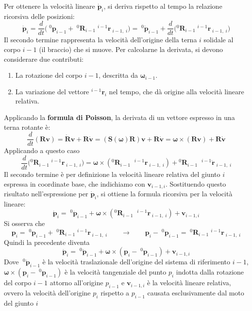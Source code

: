﻿\documentclass[11pt, a4paper]{article}
\begin{document}
Per ottenere la velocità lineare \(\dot{\bm{p}}_i\), si deriva rispetto al tempo la relazione ricorsiva delle posizioni:
\[
    \dot{\bm{p}}_i = \frac{d}{dt} \biggl( \;^{0}\bm{p}_{i-1} + \;^{0}\bm{R}_{i-1} \;^{i-1}{\bm{r}}_{\; i-1, \; i} \biggr) = \;^{0}\dot{\bm{p}}_{i-1} + \frac{d}{dt} \biggl( {}^{0}\bm{R}_{i-1} \;^{i-1}{\bm{r}}_{\; i-1, \; i} \biggr)
\]
Il secondo termine rappresenta la velocità dell'origine della terna \(i\) solidale al corpo \(i-1\) (il braccio) che si muove. Per calcolarne la derivata, si devono considerare due contributi:
\begin{enumerate}
    \item La rotazione del corpo \(i-1\), descritta da \(\bm{\omega}_{i-1}\).
    \item La variazione del vettore \(^{i-1}{\bm{r}}_i\) nel tempo, che dà origine alla velocità lineare relativa.
\end{enumerate}
Applicando la \textbf{formula di Poisson}, la derivata di un vettore espresso in una terna rotante è:
\[
    \frac{d}{dt}(\bm{R}\bm{v}) = \dot{\bm{R}}\bm{v} + \bm{R}\dot{\bm{v}} = (\bm{S}(\bm{\omega})\bm{R})\bm{v} + \bm{R}\dot{\bm{v}} = \bm{\omega} \times (\bm{R}\bm{v}) + \bm{R}\dot{\bm{v}}
\]
Applicando a questo caso
\[
    \frac{d}{dt} \biggl( {}^{0}\bm{R}_{i-1} \;{}^{i-1}{\bm{r}}_{\; i-1, \; i} \biggr) = \bm{\omega} \times ({}^{0}\bm{R}_{i-1} \; \;{}^{i-1}{\bm{r}}_{\; i-1, \; i}) + {}^{0}\bm{R}_{i-1} \; \;{}^{i-1}{\dot{\bm{r}}}_{\; i-1, \; i}
\]
Il secondo termine è per definizione la velocità lineare relativa del giunto \(i\) espressa in coordinate base, che indichiamo con \(\bm{v}_{i-1,i}\). Sostituendo questo risultato nell'espressione per \(\dot{\bm{p}}_i\), si ottiene la formula ricorsiva per la velocità lineare:
\[
    \dot{\bm{p}}_i = \;^{0}\dot{\bm{p}}_{i-1} + \bm{\omega} \times ({}^{0}\bm{R}_{i-1} \; \;{}^{i-1}{\bm{r}}_{\; i-1, \; i}) + \bm{v}_{i-1,i}
\]
Si osserva che
\[
    \bm{p}_i = \;^{0}\bm{p}_{i-1} + \;^{0}\bm{R}_{i-1} \;^{i-1}{\bm{r}}_{\; i-1, \; i} \qquad \longrightarrow \qquad \bm{p}_i - \;^{0}\bm{p}_{i-1} = \;^{0}\bm{R}_{i-1} \;^{i-1}{\bm{r}}_{\; i-1, \; i}
\]
Quindi la precedente diventa
\[
    \dot{\bm{p}}_i = \;^{0}\dot{\bm{p}}_{i-1} + \bm{\omega} \times (\bm{p}_i - \;^{0}\bm{p}_{i-1}) + \bm{v}_{i-1,i}
\]
Dove \(\;^{0}\dot{\bm{p}}_{i-1}\)  è la velocità traslazionale dell'origine del sistema di riferimento \(i-1\), \(\bm{\omega} \times (\bm{p}_i - \;^{0}\bm{p}_{i-1})\) è la velocità tangenziale del punto \(p_i\) indotta dalla rotazione del corpo \(i-1\) attorno all'origine \(p_{i-1}\) e \(\bm{v}_{i-1,i}\) è la velocità lineare relativa, ovvero la velocità dell'origine \(p_i\) rispetto a \(p_{i-1}\) causata esclusivamente dal moto del giunto \(i\)
\end{document}
